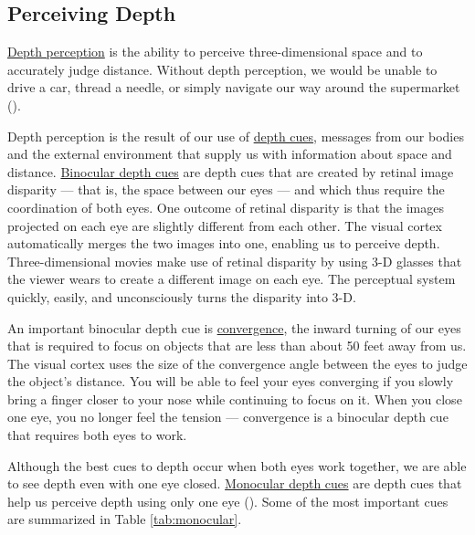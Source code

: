 \documentclass[
]{krantz}
\begin{document}
\subsection*{Perceiving Depth}\label{perceiving-depth}


\hyperref[depth-perception]{Depth perception} is the ability to perceive three-dimensional space and to accurately judge distance. Without depth perception, we would be unable to drive a car, thread a needle, or simply navigate our way around the supermarket ().

Depth perception is the result of our use of \hyperref[depth-cues]{depth cues}, messages from our bodies and the external environment that supply us with information about space and distance. \hyperref[binocular-depth-cues]{Binocular depth cues} are depth cues that are created by retinal image disparity --- that is, the space between our eyes --- and which thus require the coordination of both eyes. One outcome of retinal disparity is that the images projected on each eye are slightly different from each other. The visual cortex automatically merges the two images into one, enabling us to perceive depth. Three-dimensional movies make use of retinal disparity by using 3-D glasses that the viewer wears to create a different image on each eye. The perceptual system quickly, easily, and unconsciously turns the disparity into 3-D.

An important binocular depth cue is \hyperref[convergence]{convergence}, the inward turning of our eyes that is required to focus on objects that are less than about 50 feet away from us. The visual cortex uses the size of the convergence angle between the eyes to judge the object's distance. You will be able to feel your eyes converging if you slowly bring a finger closer to your nose while continuing to focus on it. When you close one eye, you no longer feel the tension --- convergence is a binocular depth cue that requires both eyes to work.

Although the best cues to depth occur when both eyes work together, we are able to see depth even with one eye closed. \hyperref[monocular-depth-cues]{Monocular depth cues} are depth cues that help us perceive depth using only one eye (). Some of the most important cues are summarized in Table \ref{tab:monocular}.
\end{document}
